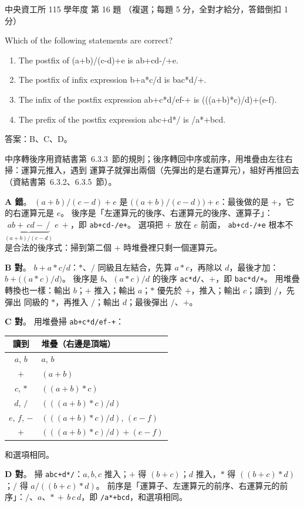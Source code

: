 \begin{pastexam}[label={px:ncu-115-dsa-16}]{中央資工所 115 學年度 第 16 題}
（複選；每題 5 分，全對才給分，答錯倒扣 1 分）

Which of the following statements are correct?
\begin{enumerate}[label=\Alph*.]
\item The postfix of (a+b)/(c-d)+e is ab+cd-/+e.
\item The postfix of infix expression b+a*c/d is bac*d/+.
\item The infix of the postfix expression ab+c*d/ef-+ is (((a+b)*c)/d)+(e-f).
\item The prefix of the postfix expression abc+d*/ is /a*+bcd.
\end{enumerate}
\end{pastexam}

\begin{pastsoln}
答案：B、C、D。

中序轉後序用資結書第~6.3.3~節的規則；後序轉回中序或前序，用堆疊由左往右掃：運算元推入，遇到
運算子就彈出兩個（先彈出的是右運算元），組好再推回去（資結書第~6.3.2、6.3.5~節）。

\textbf{A 錯}。 $(a+b)/(c-d)+e$ 是 $\bigl((a+b)/(c-d)\bigr)+e$：最後做的是 $+$，它的右運算元是 $e$。
後序是「左運算元的後序、右運算元的後序、運算子」：
$\underbrace{ab+\,cd-\,/}_{(a+b)/(c-d)}\ e\ +$，即 \texttt{ab+cd-/e+}。 選項把 $+$ 放在 $e$ 前面，
\texttt{ab+cd-/+e} 根本不是合法的後序式：掃到第二個 $+$ 時堆疊裡只剩一個運算元。

\textbf{B 對}。 $b+a*c/d$：$*$、$/$ 同級且左結合，先算 $a*c$，再除以 $d$，最後才加：
$b + \bigl((a*c)/d\bigr)$。 後序是 $b$、$(a*c)/d$ 的後序 \texttt{ac*d/}、$+$，即 \texttt{bac*d/+}。
用堆疊轉換也一樣：輸出 $b$；$+$ 推入；輸出 $a$；$*$ 優先於 $+$，推入；輸出 $c$；讀到 $/$，先彈出
同級的 $*$，再推入 $/$；輸出 $d$；最後彈出 $/$、$+$。

\textbf{C 對}。 用堆疊掃 \texttt{ab+c*d/ef-+}：
\begin{center}
\small
\begin{tabular}{cl}
\toprule
讀到 & 堆疊（右邊是頂端） \\
\midrule
$a$, $b$ & $a$, $b$ \\
$+$ & $(a+b)$ \\
$c$, $*$ & $((a+b)*c)$ \\
$d$, $/$ & $(((a+b)*c)/d)$ \\
$e$, $f$, $-$ & $(((a+b)*c)/d)$, $(e-f)$ \\
$+$ & $(((a+b)*c)/d)+(e-f)$ \\
\bottomrule
\end{tabular}
\end{center}
和選項相同。

\textbf{D 對}。 掃 \texttt{abc+d*/}：$a, b, c$ 推入；$+$ 得 $(b+c)$；$d$ 推入，$*$ 得 $((b+c)*d)$；$/$ 得
$a/((b+c)*d)$。 前序是「運算子、左運算元的前序、右運算元的前序」：$/$、$a$、$*\,{+}\,b\,c\,d$，即
\texttt{/a*+bcd}，和選項相同。
\end{pastsoln}
